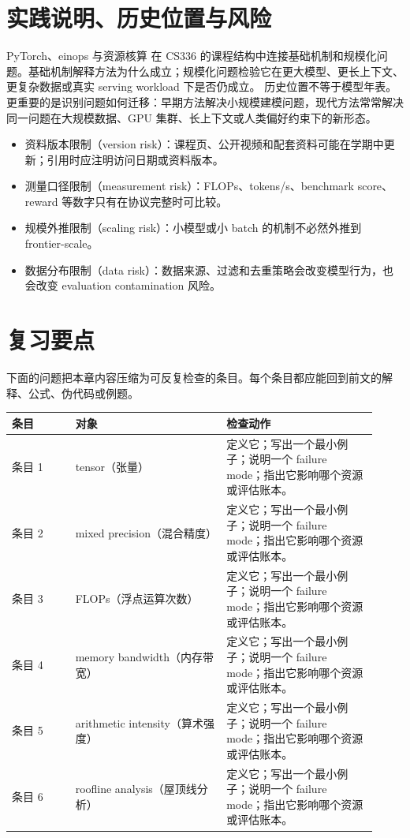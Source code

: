 \documentclass[a4paper]{article}
\begin{document}
\section{实践说明、历史位置与风险}
PyTorch、einops 与资源核算 在 CS336 的课程结构中连接基础机制和规模化问题。基础机制解释方法为什么成立；规模化问题检验它在更大模型、更长上下文、更复杂数据或真实 serving workload 下是否仍成立。
历史位置不等于模型年表。更重要的是识别问题如何迁移：早期方法解决小规模建模问题，现代方法常常解决同一问题在大规模数据、GPU 集群、长上下文或人类偏好约束下的新形态。
\begin{itemize}
\item 资料版本限制（version risk）：课程页、公开视频和配套资料可能在学期中更新；引用时应注明访问日期或资料版本。
\item 测量口径限制（measurement risk）：FLOPs、tokens/s、benchmark score、reward 等数字只有在协议完整时可比较。
\item 规模外推限制（scaling risk）：小模型或小 batch 的机制不必然外推到 frontier-scale。
\item 数据分布限制（data risk）：数据来源、过滤和去重策略会改变模型行为，也会改变 evaluation contamination 风险。
\end{itemize}
\section{复习要点}
下面的问题把本章内容压缩为可反复检查的条目。每个条目都应能回到前文的解释、公式、伪代码或例题。
\begin{longtable}{p{0.16\linewidth}p{0.38\linewidth}p{0.38\linewidth}}
\toprule
\textbf{条目} & \textbf{对象} & \textbf{检查动作}\\
\midrule
条目 1 & tensor（张量） & 定义它；写出一个最小例子；说明一个 failure mode；指出它影响哪个资源或评估账本。\\
条目 2 & mixed precision（混合精度） & 定义它；写出一个最小例子；说明一个 failure mode；指出它影响哪个资源或评估账本。\\
条目 3 & FLOPs（浮点运算次数） & 定义它；写出一个最小例子；说明一个 failure mode；指出它影响哪个资源或评估账本。\\
条目 4 & memory bandwidth（内存带宽） & 定义它；写出一个最小例子；说明一个 failure mode；指出它影响哪个资源或评估账本。\\
条目 5 & arithmetic intensity（算术强度） & 定义它；写出一个最小例子；说明一个 failure mode；指出它影响哪个资源或评估账本。\\
条目 6 & roofline analysis（屋顶线分析） & 定义它；写出一个最小例子；说明一个 failure mode；指出它影响哪个资源或评估账本。\\
\bottomrule
\end{longtable}
\end{document}
